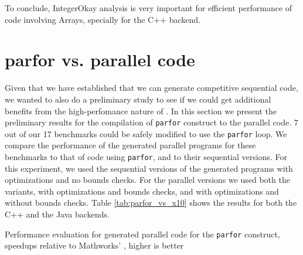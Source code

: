 To conclude, IntegerOkay analysis is very important for efficient performance of
code involving Arrays, specially for the \xten C++ backend.

\section{\matlab parfor vs. \mixten parallel code}
\label{sec:parfor_results}
 
Given that we have established that we can generate competitive
sequential code, we wanted to also do a preliminary study to see if we
could get additional benefits from the high-perfomance nature of \xten.
In this section we present the preliminary results for the
compilation of \matlab \texttt{parfor} construct to the parallel \xten
code. 7 out of our 17 benchmarks could be safely modified to use the
\texttt{parfor} loop.  We compare the performance of the generated
parallel \xten programs for these benchmarks to that of \matlab code
using \texttt{parfor}, and to their sequential \xten versions. For this
experiment, we used the sequential versions of the generated \xten
programs with optimizations and no bounds checks.  For the parallel
versions we used both the variants, with optimizations and bounds
checks, and with optimizations and without bounds checks.  Table
\ref{tab:parfor_vs_x10} shows the results for both the \xten C++ and the
\xten Java backends.
   
\begin{table}[htbp]
\begin{center} 
\scalebox{0.7}{
 
}
\caption{Performance evaluation for \mixten generated
parallel \xten code for the \matlab \texttt{parfor} construct, speedups
relative to Mathworks' \matlab,  higher is better} 
\label{tab:parfor_vs_x10} 
\end{center} 
\end{table}

